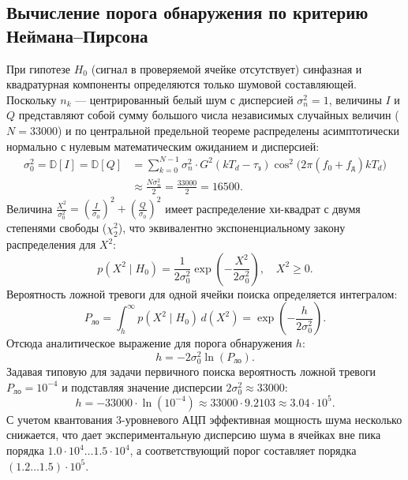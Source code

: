 \subsection{Вычисление порога обнаружения по критерию Неймана--Пирсона}
При гипотезе $H_0$ (сигнал в проверяемой ячейке отсутствует) синфазная и квадратурная компоненты определяются только шумовой составляющей. Поскольку $n_k$ --- центрированный белый шум с дисперсией $\sigma_n^2 = 1$, величины $I$ и $Q$ представляют собой сумму большого числа независимых случайных величин ($N = 33000$) и по центральной предельной теореме распределены асимптотически нормально с нулевым математическим ожиданием и дисперсией:
\begin{equation}
\begin{split}
\sigma_0^2 = \mathbb{D}[I] = \mathbb{D}[Q] &= \sum_{k=0}^{N-1} \sigma_n^2 \cdot G^2(k T_d - \tau_{\text{з}}) \cos^2\bigl(2\pi(f_0 + f_{\text{д}}) k T_d\bigr) \\
&\approx \frac{N \sigma_n^2}{2} = \frac{33000}{2} = 16500.
\end{split}
\end{equation}
Величина $\frac{X^2}{\sigma_0^2} = \left(\frac{I}{\sigma_0}\right)^2 + \left(\frac{Q}{\sigma_0}\right)^2$ имеет распределение хи-квадрат с двумя степенями свободы ($\chi_2^2$), что эквивалентно экспоненциальному закону распределения для $X^2$:
\begin{equation}
p(X^2 \mid H_0) = \frac{1}{2\sigma_0^2} \exp\left(-\frac{X^2}{2\sigma_0^2}\right), \quad X^2 \ge 0.
\end{equation}
Вероятность ложной тревоги для одной ячейки поиска определяется интегралом:
\begin{equation}
P_{\text{ло}} = \int_{h}^{\infty} p(X^2 \mid H_0) \, d(X^2) = \exp\left(-\frac{h}{2\sigma_0^2}\right).
\end{equation}
Отсюда аналитическое выражение для порога обнаружения $h$:
\begin{equation}
h = -2\sigma_0^2 \ln(P_{\text{ло}}).
\end{equation}
Задавая типовую для задачи первичного поиска вероятность ложной тревоги $P_{\text{ло}} = 10^{-4}$ и подставляя значение дисперсии $2\sigma_0^2 \approx 33000$:
\begin{equation}
h = -33000 \cdot \ln(10^{-4}) \approx 33000 \cdot 9.2103 \approx 3.04 \cdot 10^5.
\end{equation}
С учетом квантования 3-уровневого АЦП эффективная мощность шума несколько снижается, что дает экспериментальную дисперсию шума в ячейках вне пика порядка $1.0\cdot 10^4 \dots 1.5\cdot 10^4$, а соответствующий порог составляет порядка $(1.2 \dots 1.5) \cdot 10^5$.

